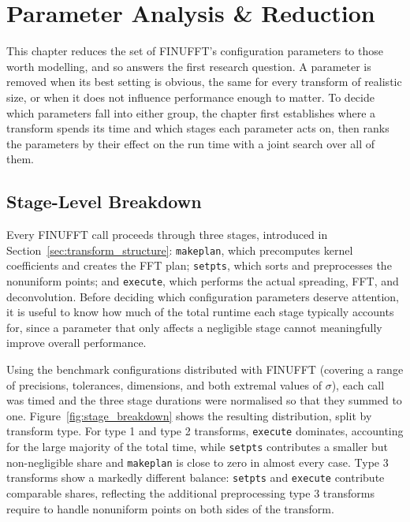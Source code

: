 \chapter{Parameter Analysis \& Reduction}
\label{ch:parameter_importance}

This chapter reduces the set of FINUFFT's configuration parameters to those worth modelling, and so answers the first research question. A parameter is removed when its best setting is obvious, the same for every transform of realistic size, or when it does not influence performance enough to matter. To decide which parameters fall into either group, the chapter first establishes where a transform spends its time and which stages each parameter acts on, then ranks the parameters by their effect on the run time with a joint search over all of them. 

\section{Stage-Level Breakdown}
\label{sec:stage_breakdown}

Every FINUFFT call proceeds through three stages, introduced in Section~\ref{sec:transform_structure}: \texttt{makeplan}, which precomputes kernel coefficients and creates the FFT plan; \texttt{setpts}, which sorts and preprocesses the nonuniform points; and \texttt{execute}, which performs the actual spreading, FFT, and deconvolution. Before deciding which configuration parameters deserve attention, it is useful to know how much of the total runtime each stage typically accounts for, since a parameter that only affects a negligible stage cannot meaningfully improve overall performance.

Using the benchmark configurations distributed with FINUFFT (covering a range of precisions, tolerances, dimensions, and both extremal values of $\sigma$), each call was timed and the three stage durations were normalised so that they summed to one. Figure~\ref{fig:stage_breakdown} shows the resulting distribution, split by transform type. For type 1 and type 2 transforms, \texttt{execute} dominates, accounting for the large majority of the total time, while \texttt{setpts} contributes a smaller but non-negligible share and \texttt{makeplan} is close to zero in almost every case. Type 3 transforms show a markedly different balance: \texttt{setpts} and \texttt{execute} contribute comparable shares, reflecting the additional preprocessing type 3 transforms require to handle nonuniform points on both sides of the transform.

